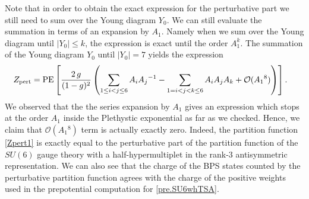 \documentclass[11pt,a4paper]{article}
\begin{document}
Note that in order to obtain the exact expression for the perturbative part we still need to sum over the Young diagram $Y_0$. We can still evaluate the summation in terms of an expansion by $A_1$. Namely when we sum over the Young diagram until $|Y_0| \leq k$, the expression is exact until the order $A_1^k$. The summation of the Young diagram $Y_0$ until $|Y_0| = 7$ yields the expression  
\begin{align}
Z_{\rm pert} 
&= \text{PE}\left[\frac{2\,g}{(1-g)^2} 
\left( \sum_{1 \le i < j \le 6} A_i A_j{}^{-1} 
- \sum_{1 = i < j < k \le 6} A_i A_j A_k
+ \mathcal{O} (A_1{}^8)\right)\right].\label{Zpert1}
\end{align} 
We observed that the the series expansion by $A_1$ gives an expression which stops at the order $A_1$ inside the Plethystic exponential as far as we checked. Hence, we claim that $\mathcal{O} (A_1{}^8)$ term is actually exactly zero. Indeed, the partition function \eqref{Zpert1} is exactly equal to the perturbative part of the partition function of the $SU(6)$ gauge theory with a half-hypermultiplet in the rank-3 antisymmetric representation. We can also see that the charge of the BPS states counted by the perturbative partition function agrees with the charge of the positive weights used in the prepotential computation for \eqref{pre.SU6whTSA}.
\end{document}
